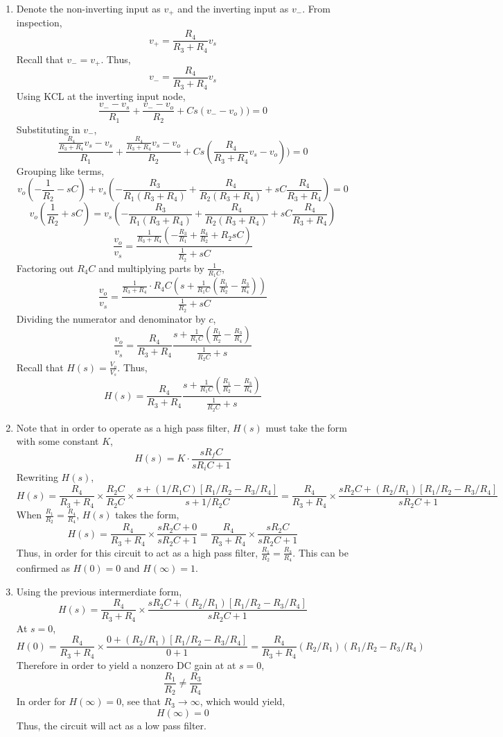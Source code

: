 \documentclass{article}
\begin{document}
\begin{enumerate}[label=(\alph*)]
    \item 
        Denote the non-inverting input as $v_+$ and the inverting input as $v_-$. 
        From inspection, 
        $$v_+=\frac{R_4}{R_3 + R_4}v_s$$
        Recall that $v_-=v_+$. Thus,
        $$v_-=\frac{R_4}{R_3 + R_4}v_s$$
        Using KCL at the inverting input node, 
        $$\frac{v_-  -v_s}{R_1} + \frac{v_- - v_o}{R_2} + Cs(v_- - v_o)) = 0$$
        Substituting in $v_-$,
        $$\frac{\frac{R_4}{R_3 + R_4}v_s - v_s}{R_1} + \frac{\frac{R_4}{R_3 + R_4}v_s - v_o}{R_2} + Cs(\frac{R_4}{R_3 + R_4}v_s-v_o)) = 0$$
        Grouping like terms,
        $$v_o(-\frac{1}{R_2}-sC)+v_s(-\frac{R_3}{R_1(R_3 + R_4)} + \frac{R_4}{R_2(R_3 + R_4)} + sC\frac{R_4}{R_3 + R_4})=0$$
        $$v_o(\frac{1}{R_2}+sC)=v_s(-\frac{R_3}{R_1(R_3 + R_4)} + \frac{R_4}{R_2(R_3 + R_4)} + sC\frac{R_4}{R_3 + R_4})$$
        $$\frac{v_o}{v_s}=\frac{\frac{1}{R_3+R_4}\left( -\frac{R_3}{R_1} + \frac{R_4}{R_2} + R_2sC  \right)}{\frac{1}{R_2} + sC}$$
        Factoring out $R_4C$ and multiplying parts by $\frac{1}{R_1C}$,
        $$\frac{v_o}{v_s}=\frac{\frac{1}{R_3+R_4}\cdot R_4C\left( s + \frac{1}{R_1C}(\frac{R_1}{R_2} - \frac{R_3}{R_4})\right)}{\frac{1}{R_2}+sC}$$
        Dividing the numerator and denominator by $c$,
        $$\frac{v_o}{v_s}=\frac{R_4}{R_3+R_4}\frac{s + \frac{1}{R_1C}(\frac{R_1}{R_2} - \frac{R_3}{R_4})}{\frac{1}{R_2C}+s}$$
        Recall that $H(s)=\frac{V_o}{V_s}$.
        Thus, 
        $$H(s)=\frac{R_4}{R_3+R_4}\frac{s + \frac{1}{R_1C}(\frac{R_1}{R_2} - \frac{R_3}{R_4})}{\frac{1}{R_2C}+s}$$

    \item Note that in order to operate as a high pass filter, $H(s)$ must take the form with some constant $K$,
        $$H(s)=K\cdot \frac{sR_fC}{sR_iC + 1}$$
        Rewriting $H(s)$, $$H(s)=\frac{R_4}{R_3 + R_4} \times \frac{R_2C}{R_2C} \times \frac{s + (1/R_1C)[R_1/R_2 - R_3/R_4]}{s + 1/R_2C}=\frac{R_4}{R_3 + R_4} \times \frac{sR_2C + (R_2/R_1)[R_1/R_2 - R_3/R_4]}{sR_2C + 1}$$
        When $\frac{R_1}{R_2}=\frac{R_4}{R_4}$, $H(s)$ takes the form,
        $$H(s)=\frac{R_4}{R_3 + R_4} \times \frac{sR_2C + 0}{sR_2C + 1}=\frac{R_4}{R_3 + R_4} \times \frac{sR_2C}{sR_2C + 1}$$
        Thus, in order for this circuit to act as a high pass filter, $\frac{R_1}{R_2}=\frac{R_3}{R_4}$.
        This can be confirmed as $H(0)=0$ and $H(\infty)=1$.
    \item 
        Using the previous intermerdiate form, $$H(s)=\frac{R_4}{R_3 + R_4} \times \frac{sR_2C + (R_2/R_1)[R_1/R_2 - R_3/R_4]}{sR_2C + 1}$$
        At $s=0$, $$H(0)=\frac{R_4}{R_3 + R_4} \times \frac{0 + (R_2/R_1)[R_1/R_2 - R_3/R_4]}{0 + 1}=\frac{R_4}{R_3 + R_4} (R_2/R_1)(R_1/R_2 - R_3/R_4)$$
        Therefore in order to yield a nonzero DC gain at at $s=0$, $$\frac{R_1}{R_2} \neq \frac{R_3}{R_4}$$
        In order for $H(\infty)=0$, see that $R_3\rightarrow \infty$, which would yield,
        $$H(\infty)=0$$
        Thus, the circuit will act as a low pass filter.


\end{enumerate}
\end{document}
